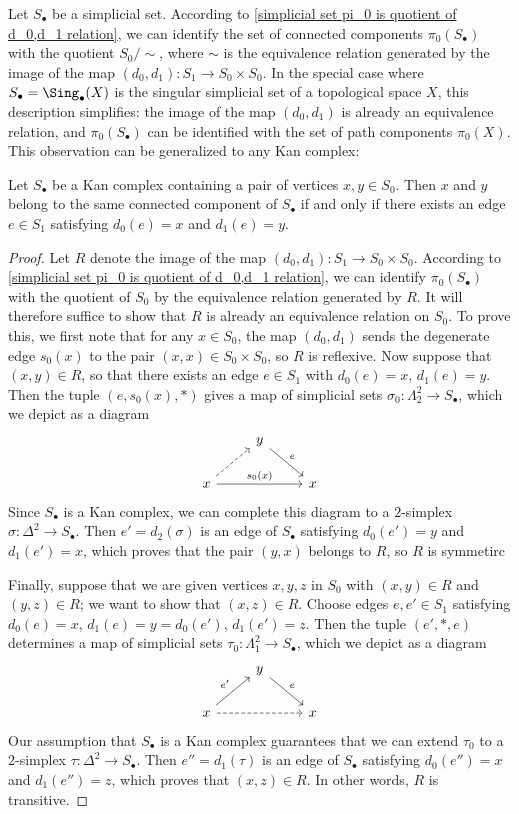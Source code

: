 Let $S_\bullet$ be a simplicial set. According to \cref{simplicial set pi_0 is quotient of d_0,d_1 relation}, we can identify the set of connected components $\pi_0(S_\bullet)$ with the quotient $S_0/\sim$, where $\sim$ is the equivalence relation generated by the image of the map $(d_0,d_1):S_1\to S_0\times S_0$. In the special case where $S_\bullet=\Sing_\bullet(X)$ is the singular simplicial set of a topological space $X$, this description simplifies: the image of the map $(d_0,d_1)$ is already an equivalence relation, and $\pi_0(S_\bullet)$ can be identified with the set of path components $\pi_0(X)$. This observation can be generalized to any Kan complex:
\begin{proposition}\label{simplicial set Kan same component iff connected by edge}
Let $S_\bullet$ be a Kan complex containing a pair of vertices $x,y\in S_0$. Then $x$ and $y$ belong to the same connected component of $S_\bullet$ if and only if there exists an edge $e\in S_1$ satisfying $d_0(e)=x$ and $d_1(e)=y$.
\end{proposition}
\begin{proof}
Let $R$ denote the image of the map $(d_0,d_1):S_1\to S_0\times S_0$. According to \cref{simplicial set pi_0 is quotient of d_0,d_1 relation}, we can identify $\pi_0(S_\bullet)$ with the quotient of $S_0$ by the equivalence relation generated by $R$. It will therefore suffice to show that $R$ is already an equivalence relation on $S_0$. To prove this, we first note that for any $x\in S_0$, the map $(d_0,d_1)$ sends the degenerate edge $s_0(x)$ to the pair $(x,x)\in S_0\times S_0$, so $R$ is reflexive. Now suppose that $(x,y)\in R$, so that there exists an edge $e\in S_1$ with $d_0(e)=x$, $d_1(e)=y$. Then the tuple $(e,s_0(x),\ast)$ gives a map of simplicial sets $\sigma_0:\Lambda^2_2\to S_\bullet$, which we depict as a diagram
\[\begin{tikzcd}
&y\ar[rd,"e"]&\\
x\ar[ru,dashed]\ar[rr,"s_0(x)"]&&x
\end{tikzcd}\]
Since $S_\bullet$ is a Kan complex, we can complete this diagram to a $2$-simplex $\sigma:\Delta^2\to S_\bullet$. Then $e'=d_2(\sigma)$ is an edge of $S_\bullet$ satisfying $d_0(e')=y$ and $d_1(e')=x$, which proves that the pair $(y,x)$ belongs to $R$, so $R$ is symmetirc\par
Finally, suppose that we are given vertices $x,y,z$ in $S_0$ with $(x,y)\in R$ and $(y,z)\in R$; we want to show that $(x,z)\in R$. Choose edges $e,e'\in S_1$ satisfying $d_0(e)=x$, $d_1(e)=y=d_0(e')$, $d_1(e')=z$. Then the tuple $(e',\ast,e)$ determines a map of simplicial sets $\tau_0:\Lambda^2_1\to S_\bullet$, which we depict as a diagram
\[\begin{tikzcd}
&y\ar[rd,"e"]&\\
x\ar[ru,"e'"]\ar[rr,dashed]&&x
\end{tikzcd}\]
Our assumption that $S_\bullet$ is a Kan complex guarantees that we can extend $\tau_0$ to a $2$-simplex $\tau:\Delta^2\to S_\bullet$. Then $e''=d_1(\tau)$ is an edge of $S_\bullet$ satisfying $d_0(e'')=x$ and $d_1(e'')=z$, which proves that $(x,z)\in R$. In other words, $R$ is transitive.
\end{proof}
